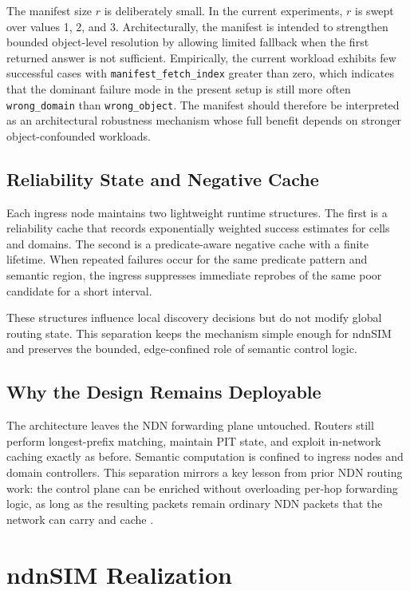 \documentclass[journal]{IEEEtran}
\begin{document}
The manifest size $r$ is deliberately small. In the current experiments, $r$ is swept over values 1, 2, and 3. Architecturally, the manifest is intended to strengthen bounded object-level resolution by allowing limited fallback when the first returned answer is not sufficient. Empirically, the current workload exhibits few successful cases with \texttt{manifest\_fetch\_index} greater than zero, which indicates that the dominant failure mode in the present setup is still more often \texttt{wrong\_domain} than \texttt{wrong\_object}. The manifest should therefore be interpreted as an architectural robustness mechanism whose full benefit depends on stronger object-confounded workloads.

\subsection{Reliability State and Negative Cache}

Each ingress node maintains two lightweight runtime structures. The first is a reliability cache that records exponentially weighted success estimates for cells and domains. The second is a predicate-aware negative cache with a finite lifetime. When repeated failures occur for the same predicate pattern and semantic region, the ingress suppresses immediate reprobes of the same poor candidate for a short interval.

These structures influence local discovery decisions but do not modify global routing state. This separation keeps the mechanism simple enough for ndnSIM and preserves the bounded, edge-confined role of semantic control logic.

\subsection{Why the Design Remains Deployable}

The architecture leaves the NDN forwarding plane untouched. Routers still perform longest-prefix matching, maintain PIT state, and exploit in-network caching exactly as before. Semantic computation is confined to ingress nodes and domain controllers. This separation mirrors a key lesson from prior NDN routing work: the control plane can be enriched without overloading per-hop forwarding logic, as long as the resulting packets remain ordinary NDN packets that the network can carry and cache \cite{nlsr,hrouting}.

\section{ndnSIM Realization}
\end{document}

